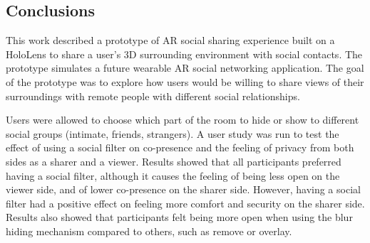 \subsection{Conclusions}

This work described a prototype of AR social sharing experience built on a HoloLens to share a user's 3D surrounding environment with social contacts. The prototype simulates a future wearable AR social networking application. The goal of the prototype was to explore how users would be willing to share views of their surroundings with remote people with different social relationships. 

Users were allowed to choose which part of the room to hide or show to different social groups (intimate, friends, strangers). A user study was run to test the effect of using a social filter on co-presence and the feeling of privacy from both sides as a sharer and a viewer. Results showed that all participants preferred having a social filter, although it causes the feeling of being less open on the viewer side, and of lower co-presence on the sharer side. However, having a social filter had a positive effect on feeling more comfort and security on the sharer side. Results also showed that participants felt being more open when using the blur hiding mechanism compared to others, such as remove or overlay. 


